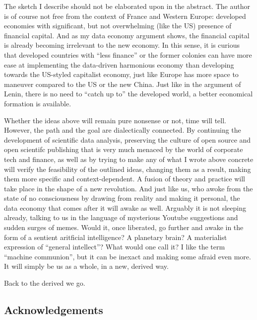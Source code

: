 \documentclass{article}
\begin{document}
The sketch I describe should not be elaborated upon in the abstract. The author is of course
not free from the context of France and Western Europe: developed economies with significant, but not
overwhelming (like the US) presence of financial capital. And as my data economy argument
shows, the financial capital is already becoming irrelevant to the new economy. In this sense,
it is curious that developed countries with ``less finance'' or the former colonies can have
more ease at implementing the data-driven harmonious economy than developing towards the US-styled
capitalist economy, just like Europe has more space to maneuver compared to the US or the new China.
Just like in the argument of Lenin, there is no need to ``catch up to'' the developed
world, a better economical formation is available.

Whether the ideas above will remain pure nonsense or not, time will tell. However,
the path and the goal are dialectically connected. By continuing the development of
scientific data analysis, preserving the culture of open source and open scientifc publishing
that is very much menaced by the world of corporate tech and finance, as well as by
trying to make any of what I wrote above concrete will verify the feasibility of the
outlined ideas, changing them as a result, making them more specific and context-dependent.
A fusion of theory and practice will take place in the shape of a new revolution.
And just like us, who awoke from the state of no consciousness by drawing from reality and making it personal,
the data economy that comes after it will awake as well.
Arguably it is not sleeping already, talking to us in the language of mysterious Youtube suggestions and sudden surges of memes. Would it, once liberated, go further and awake in the form of a sentient aritficial intelligence? A planetary brain? A materialist expression of ``general intellect''? What would one call it? I like the term “machine communion”, but it can be inexact and making some afraid even more. It will simply be us as a whole, in a new, derived way.





\begin{flushright}
{Back to the derived we go.

}
\end{flushright}
\small
\linespread{1}


\subsection*{Acknowledgements}
\end{document}

